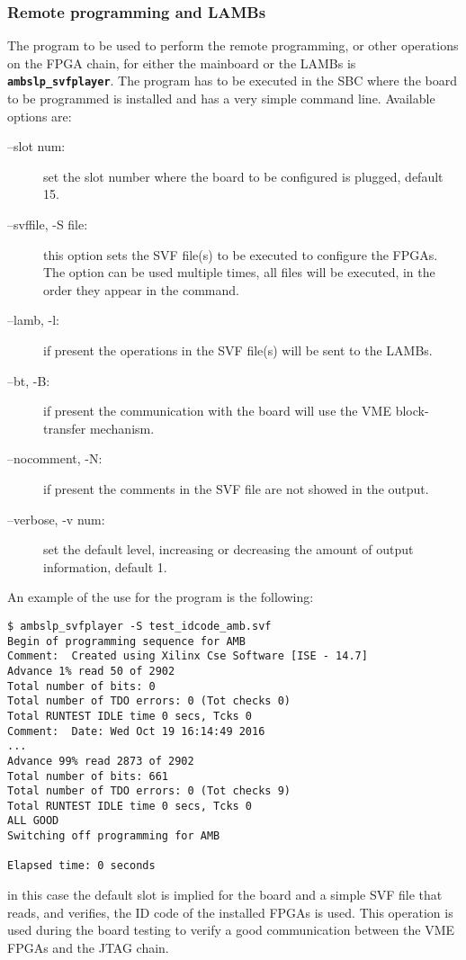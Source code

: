 \subsubsection{Remote programming \AMBoard and LAMBs}

The program to be used to perform the remote programming, or other operations
on the FPGA chain, for either the mainboard
or the LAMBs is \textbf{\texttt{ambslp\_svfplayer}}. 
The program has to
be executed in the SBC where the board to be programmed is installed and has
a very simple command line. Available options are:
\begin{description}
\item[--slot num:] set the slot number where the board to be configured is
plugged, default 15.

\item[--svffile, -S file:] this option sets the SVF file(s) to be executed to
configure the FPGAs. The option can be used multiple times, all files will be
executed, in the order they appear in the command.

\item[--lamb, -l:] if present the operations in the SVF file(s) will be sent
to the LAMBs.

\item[--bt, -B:] if present the communication with the board will use the 
VME block-transfer mechanism.

\item[--nocomment, -N:] if present the comments in the SVF file are not
showed in the output.

\item[--verbose, -v num:] set the default level, increasing or decreasing
the amount of output information, default 1.
\end{description}

An example of the use for the program is the following:
\begin{verbatim}
$ ambslp_svfplayer -S test_idcode_amb.svf
Begin of programming sequence for AMB
Comment:  Created using Xilinx Cse Software [ISE - 14.7]
Advance 1% read 50 of 2902
Total number of bits: 0
Total number of TDO errors: 0 (Tot checks 0)
Total RUNTEST IDLE time 0 secs, Tcks 0
Comment:  Date: Wed Oct 19 16:14:49 2016
...
Advance 99% read 2873 of 2902
Total number of bits: 661
Total number of TDO errors: 0 (Tot checks 9)
Total RUNTEST IDLE time 0 secs, Tcks 0
ALL GOOD
Switching off programming for AMB

Elapsed time: 0 seconds
\end{verbatim}
in this case the default slot is implied for the board and a simple
SVF file that reads, and verifies, the ID code of the installed FPGAs is used.
This operation is used during the board testing to verify a good 
communication between the VME FPGAs and the JTAG chain. 

